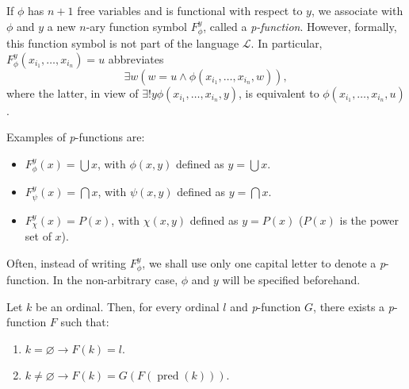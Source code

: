 \begin{definition}
    \label{def:pFunc}
    \leanok
    If $\phi$ has $n+1$ free variables and is functional with respect to $y$, 
    we associate with $\phi$ and $y$ a new $n$-ary function symbol $F_\phi^y$, 
    called a \textit{p-function}. 
    However, formally, this function symbol is not part of the language $\mathcal{L}$. 
    In particular, $F_\phi^y(x_{i_1},\ldots,x_{i_n})=u$ abbreviates
    $$
    \exists w (w = u \land \phi (x_{i_1},\ldots,x_{i_n},w)),
    $$
    where the latter, in view of $\exists! y \phi (x_{i_1},\ldots,x_{i_n},y)$, 
    is equivalent to $\phi (x_{i_1},\ldots,x_{i_n},u)$.

    Examples of \textit{p}-functions are:
    \begin{itemize}
        \item $F_\phi^y(x) = \bigcup x$, with $\phi(x,y)$ defined as $y = \bigcup x$.
        \item $F_\psi^y(x) = \bigcap x$, with $\psi(x,y)$ defined as $y = \bigcap x$.
        \item $F_\chi^y(x) = P (x)$, with $\chi(x,y)$ defined as $y = P (x)$
        ($P(x)$ is the power set of $x$).
    \end{itemize}

    Often, instead of writing $F_\phi^y$, we shall use only one capital letter to 
    denote a \textit{p}-function. 
    In the non-arbitrary case, $\phi$ and $y$ will be specified beforehand.
\end{definition}

\begin{theorem}
    \label{thm:Ord.exists_pFuncRecursive}
    Let $k$ be an ordinal. Then, for every ordinal $l$ and \textit{p}-function $G$,
    there exists a \textit{p}-function $F$ such that:
    \begin{enumerate}
        \item $k=\varnothing \rightarrow F(k) = l$.
        \item $k\neq \varnothing \rightarrow F(k) = G(F(\operatorname{pred}(k)))$.
    \end{enumerate}
\end{theorem}

